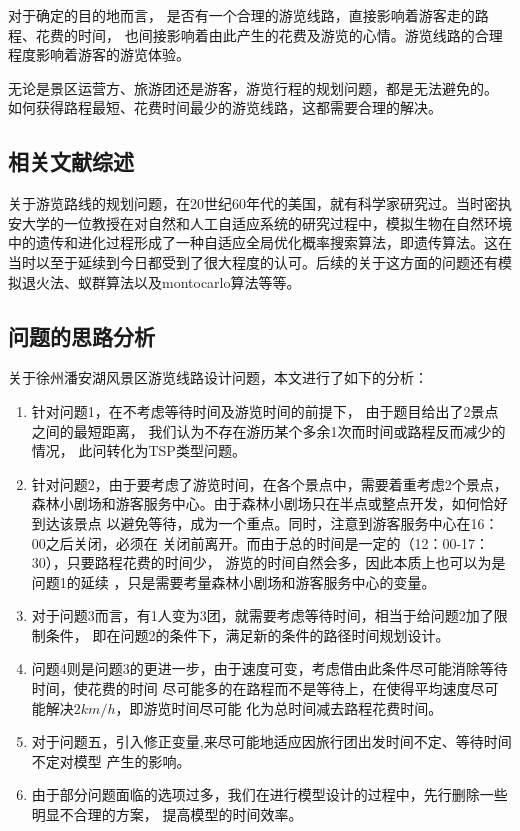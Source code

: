 \documentclass[hyperref,UTF8]{article}
\begin{document}
{对于确定的目的地而言，
是否有一个合理的游览线路，直接影响着游客走的路程、花费的时间，
也间接影响着由此产生的花费及游览的心情。游览线路的合理程度影响着游客的游览体验。

无论是景区运营方、旅游团还是游客，游览行程的规划问题，都是无法避免的。
如何获得路程最短、花费时间最少的游览线路，这都需要合理的解决。

\subsection{相关文献综述}
关于游览路线的规划问题，在20世纪60年代的美国，就有科学家研究过。当时密执安大学的一位教授在对自然和人工自适应系统的研究过程中，模拟生物在自然环境中的遗传和进化过程形成了一种自适应全局优化概率搜索算法，即遗传算法。这在当时以至于延续到今日都受到了很大程度的认可。后续的关于这方面的问题还有模拟退火法、蚁群算法以及montocarlo算法等等。

\subsection{问题的思路分析}
关于徐州潘安湖风景区游览线路设计问题，本文进行了如下的分析：
\begin{enumerate}
\item 针对问题1，在不考虑等待时间及游览时间的前提下，
由于题目给出了2景点之间的最短距离，
我们认为不存在游历某个多余1次而时间或路程反而减少的情况，
此问转化为TSP类型问题。
\item 针对问题2，由于要考虑了游览时间，在各个景点中，需要着重考虑2个景点，
森林小剧场和游客服务中心。由于森林小剧场只在半点或整点开发，如何恰好到达该景点
以避免等待，成为一个重点。同时，注意到游客服务中心在16：00之后关闭，必须在
关闭前离开。而由于总的时间是一定的（12：00-17：30），只要路程花费的时间少，
游览的时间自然会多，因此本质上也可以为是问题1的延续
，只是需要考量森林小剧场和游客服务中心的变量。
\item 对于问题3而言，有1人变为3团，就需要考虑等待时间，相当于给问题2加了限制条件，
即在问题2的条件下，满足新的条件的路径时间规划设计。
\item 问题4则是问题3的更进一步，由于速度可变，考虑借由此条件尽可能消除等待时间，使花费的时间
尽可能多的在路程而不是等待上，在使得平均速度尽可能解决$2km/h$，即游览时间尽可能
化为总时间减去路程花费时间。
\item 对于问题五，引入修正变量,来尽可能地适应因旅行团出发时间不定、等待时间不定对模型
产生的影响。
\item 由于部分问题面临的选项过多，我们在进行模型设计的过程中，先行删除一些明显不合理的方案，
提高模型的时间效率。
\end{enumerate}



}
\end{document}
